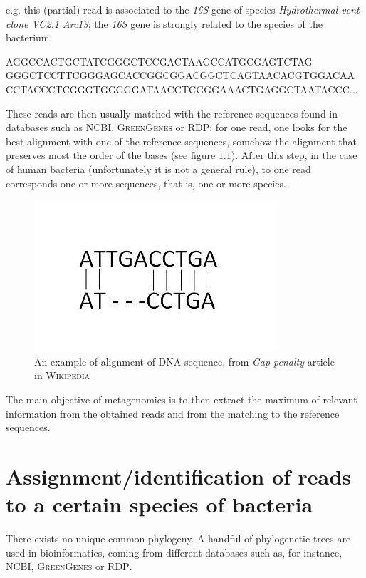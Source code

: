 \documentclass{report}
\begin{document}
e.g. this (partial) read is associated to the \emph{16S} gene of species \emph{Hydrothermal vent clone VC2.1 Arc13}; the \emph{16S} gene is strongly related to the species of the bacterium:\\
\begin{center}
AGGCCACTGCTATCGGGCTCCGACTAAGCCATGCGAGTCTAG\\
GGGCTCCTTCGGGAGCACCGGCGGACGGCTCAGTAACACGTGGACAA\\
CCTACCCTCGGGTGGGGGATAACCTCGGGAAACTGAGGCTAATACCC...\\
\end{center}

These reads are then usually matched with the reference sequences found in databases such as \textsc{NCBI}, \textsc{GreenGenes} or \textsc{RDP}: for one read, one looks for the best alignment with one of the reference sequences, somehow the alignment that preserves most the order of the bases (see figure $1.1$). After this step, in the case of human bacteria (unfortunately it is not a general rule), to one read corresponds one or more sequences, that is, one or more species.\\

\begin{figure}[H]
\centering
\includegraphics[scale=0.5]{illustrations/Sequence_gaps.JPG}
\caption{An example of alignment of DNA sequence, from \emph{Gap penalty} article in \textsc{Wikipedia}}
\end{figure}

The main objective of metagenomics is to then extract the maximum of relevant information from the obtained reads and from the matching to the reference sequences.

\section{Assignment/identification of reads to a certain species of bacteria}

There exists no unique common phylogeny. A handful of phylogenetic trees are used in bioinformatics, coming from different databases such as, for instance, \textsc{NCBI}, \textsc{GreenGenes} or \textsc{RDP}.\\
\end{document}
